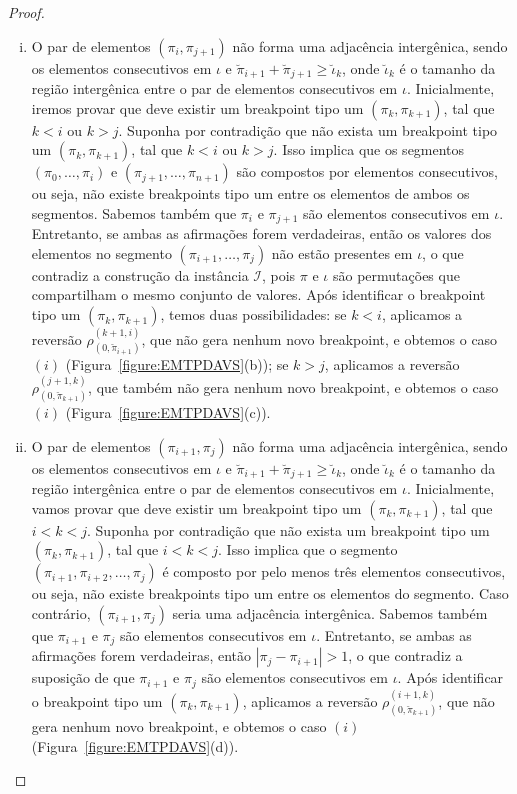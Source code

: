 \begin{proof}
\begin{enumerate}[i.]
    \item O par  de elementos $(\pi_i,\pi_{j+1})$ não forma uma adjacência intergênica, sendo os elementos consecutivos em $\iota$ e $\breve\pi_{i+1} + \breve\pi_{j+1} \ge \breve\iota_k$, onde $\breve\iota_k$ é o tamanho da região intergênica entre o par de elementos consecutivos em $\iota$. Inicialmente, iremos provar que deve existir um breakpoint tipo um $(\pi_k,\pi_{k+1})$, tal que $k < i$ ou $k > j$. Suponha por contradição que não exista um breakpoint tipo um $(\pi_k,\pi_{k+1})$, tal que $k < i$ ou $k > j$. Isso implica que os segmentos $(\pi_0,\dots,\pi_i)$ e $(\pi_{j+1},\dots,\pi_{n+1})$ são compostos por elementos consecutivos, ou seja, não existe breakpoints tipo um entre os elementos de ambos os segmentos. Sabemos também que $\pi_i$ e $\pi_{j+1}$ são elementos consecutivos em $\iota$. Entretanto, se ambas as afirmações forem verdadeiras, então os valores dos elementos no segmento $(\pi_{i+1},\dots,\pi_j)$ não estão presentes em $\iota$, o que contradiz a construção da instância $\mathcal{I}$, pois $\pi$ e $\iota$ são permutações que compartilham o mesmo conjunto de valores. Após identificar o breakpoint tipo um $(\pi_k,\pi_{k+1})$, temos duas possibilidades: se $k < i$, aplicamos a reversão $\rho^{(k+1,i)}_{(0,\breve\pi_{i+1})}$, que não gera nenhum novo breakpoint, e obtemos o caso $(i)$ (Figura~\ref{figure:EMTPDAVS}(b)); se $k > j$, aplicamos a reversão $\rho^{(j+1,k)}_{(0,\breve\pi_{k+1})}$, que também não gera nenhum novo breakpoint, e obtemos o caso $(i)$ (Figura~\ref{figure:EMTPDAVS}(c)).
    \item O par de elementos $(\pi_{i+1},\pi_{j})$ não forma uma adjacência intergênica, sendo os elementos consecutivos em $\iota$ e $\breve\pi_{i+1} + \breve\pi_{j+1} \ge \breve\iota_k$, onde $\breve\iota_k$ é o tamanho da região intergênica entre o par de elementos consecutivos em $\iota$. Inicialmente, vamos provar que deve existir um breakpoint tipo um $(\pi_k,\pi_{k+1})$, tal que $i < k < j$. Suponha por contradição que não exista um breakpoint tipo um $(\pi_k,\pi_{k+1})$, tal que $i < k < j$. Isso implica que o segmento $(\pi_{i+1},\pi_{i+2},\dots,\pi_j)$ é composto por pelo menos três elementos consecutivos, ou seja, não existe breakpoints tipo um entre os elementos do segmento. Caso contrário, $(\pi_{i+1},\pi_{j})$ seria uma adjacência intergênica. Sabemos também que $\pi_{i+1}$ e $\pi_{j}$ são elementos consecutivos em $\iota$. Entretanto, se ambas as afirmações forem verdadeiras, então $|\pi_j - \pi_{i+1}| > 1$, o que contradiz a suposição de que $\pi_{i+1}$ e $\pi_{j}$ são elementos consecutivos em $\iota$. Após identificar o breakpoint tipo um $(\pi_k,\pi_{k+1})$, aplicamos a reversão $\rho^{(i+1,k)}_{(0,\breve\pi_{k+1})}$, que não gera nenhum novo breakpoint, e obtemos o caso $(i)$ (Figura~\ref{figure:EMTPDAVS}(d)).

\end{enumerate}
\end{proof}

